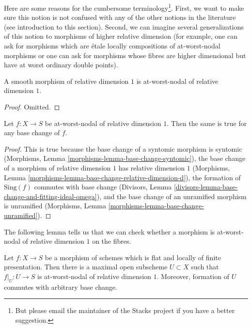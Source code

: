 \noindent
Here are some reasons for the cumbersome terminology\footnote{But please
email the maintainer of the Stacks project if you have a better suggestion.}.
First, we want to make sure this notion is not confused with any of the
other notions in the literature (see introduction to this section).
Second, we can imagine several generalizations of this notion to morphisms
of higher relative dimension (for example, one can ask for morphisms
which are \'etale locally compositions of at-worst-nodal morphisms or
one can ask for morphisms whose fibres are higher dimensional but have
at worst ordinary double points).

\begin{lemma}
\label{lemma-smooth-relative-dimension-1}
A smooth morphism of relative dimension $1$ is
at-worst-nodal of relative dimension $1$.
\end{lemma}

\begin{proof}
Omitted.
\end{proof}

\begin{lemma}
\label{lemma-base-change-nodal-family}
Let $f : X \to S$ be at-worst-nodal of relative dimension $1$.
Then the same is true for any base change of $f$.
\end{lemma}

\begin{proof}
This is true because the base change of a syntomic morphism
is syntomic (Morphisms, Lemma \ref{morphisms-lemma-base-change-syntomic}),
the base change of a morphism of relative dimension $1$ has
relative dimension $1$
(Morphisms, Lemma \ref{morphisms-lemma-base-change-relative-dimension-d}),
the formation of $\text{Sing}(f)$ commutes with base change
(Divisors, Lemma
\ref{divisors-lemma-base-change-and-fitting-ideal-omega}), and
the base change of an unramified morphism is unramified
(Morphisms, Lemma \ref{morphisms-lemma-base-change-unramified}).
\end{proof}

\noindent
The following lemma tells us that we can check whether a morphism
is at-worst-nodal of relative dimension $1$ on the fibres.

\begin{lemma}
\label{lemma-locus-where-nodal}
Let $f : X \to S$ be a morphism of schemes which is flat and
locally of finite presentation. Then there is a maximal open
subscheme $U \subset X$ such that $f|_U : U \to S$ is
at-worst-nodal of relative dimension $1$. Moreover, formation
of $U$ commutes with arbitrary base change.
\end{lemma}

